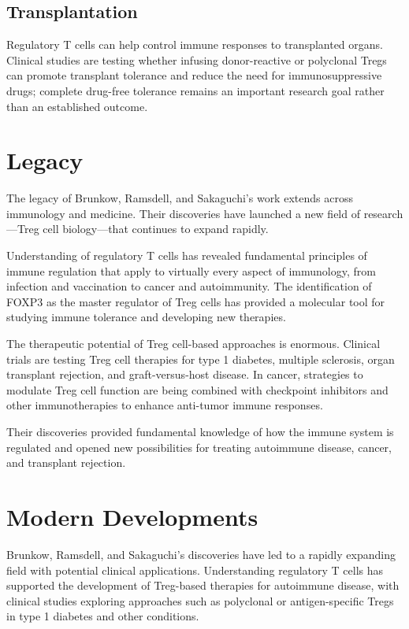 \subsection{Transplantation}

Regulatory T cells can help control immune responses to transplanted organs. Clinical studies are testing whether infusing donor-reactive or polyclonal Tregs can promote transplant tolerance and reduce the need for immunosuppressive drugs; complete drug-free tolerance remains an important research goal rather than an established outcome.

\section{Legacy}

The legacy of Brunkow, Ramsdell, and Sakaguchi's work extends across immunology and medicine. Their discoveries have launched a new field of research---Treg cell biology---that continues to expand rapidly.

Understanding of regulatory T cells has revealed fundamental principles of immune regulation that apply to virtually every aspect of immunology, from infection and vaccination to cancer and autoimmunity. The identification of FOXP3 as the master regulator of Treg cells has provided a molecular tool for studying immune tolerance and developing new therapies.

The therapeutic potential of Treg cell-based approaches is enormous. Clinical trials are testing Treg cell therapies for type 1 diabetes, multiple sclerosis, organ transplant rejection, and graft-versus-host disease. In cancer, strategies to modulate Treg cell function are being combined with checkpoint inhibitors and other immunotherapies to enhance anti-tumor immune responses.

Their discoveries provided fundamental knowledge of how the immune system is regulated and opened new possibilities for treating autoimmune disease, cancer, and transplant rejection.

\section{Modern Developments}

Brunkow, Ramsdell, and Sakaguchi's discoveries have led to a rapidly expanding field with potential clinical applications. Understanding regulatory T cells has supported the development of Treg-based therapies for autoimmune disease, with clinical studies exploring approaches such as polyclonal or antigen-specific Tregs in type 1 diabetes and other conditions.

